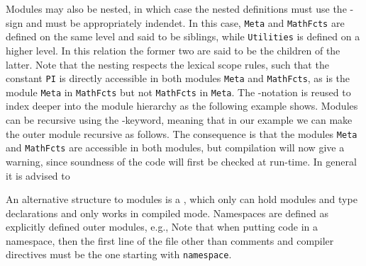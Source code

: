 Modules may also be nested, in which case the nested definitions must use the \lexeme{=}-sign and must be appropriately indendet.
%
%
In this case, \lstinline{Meta} and \lstinline{MathFcts} are defined on the same level and said to be siblings, while \lstinline{Utilities} is defined on a higher level. In this relation the former two are said to be the children of the latter.  Note that the nesting respects the lexical scope rules, such that the constant \lstinline{PI} is directly accessible in both modules \lstinline{Meta} and \lstinline{MathFcts}, as is the module \lstinline{Meta} in \lstinline{MathFcts} but not \lstinline{MathFcts} in \lstinline{Meta}.  The -notation is reused to index deeper into the module hierarchy as the following example shows.
%
%
Modules can be recursive using the -keyword, meaning that in our example we can make the outer module recursive as follows.
%
%
The consequence is that the modules \lstinline{Meta} and \lstinline{MathFcts} are accessible in both modules, but compilation will now give a warning, since soundness of the code will first be checked at run-time. In general it is advised to 

An alternative structure to modules is a , which only can hold modules and type declarations and only works in compiled mode. Namespaces are defined as explicitly defined outer modules, e.g.,
%
%
Note that when putting code in a namespace, then the first line of the file other than comments and compiler directives must be the one starting with \lstinline{namespace}.

